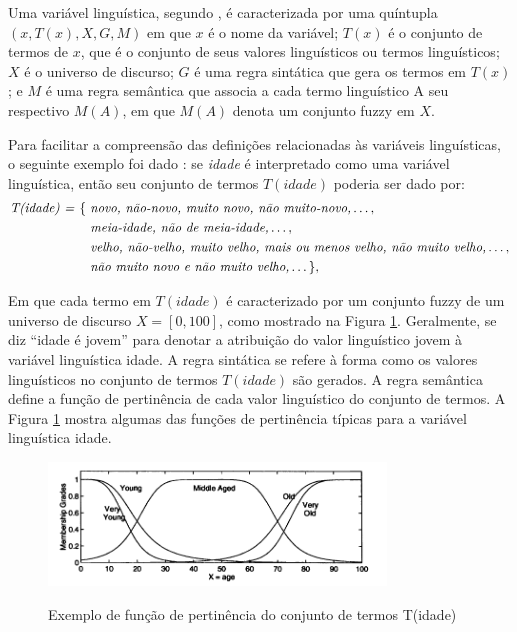Uma variável linguística, segundo , é caracterizada por uma quíntupla $(x,T(x),X,G,M)$ em que $x$ é o nome da variável; $T(x)$ é o conjunto de termos de $x$, que é o conjunto de seus valores linguísticos ou termos linguísticos; $X$ é o universo de discurso; $G$ é uma regra sintática que gera os termos em $T(x)$; e $M$ é uma regra semântica que associa a cada termo linguístico A seu respectivo $M(A)$, em que $M(A)$ denota um conjunto fuzzy em $X$.

Para facilitar a compreensão das definições relacionadas às variáveis linguísticas, o seguinte exemplo foi dado \cite[p.~55]{Jang1997}: se \textit{idade} é interpretado como uma variável linguística, então seu conjunto de termos $T(idade)$ poderia ser dado por:
\begin{align*}
\mbox{\textit{T(idade) = }}\{ &\mbox{ \textit{novo, não-novo, muito novo, não muito-novo,}} \dots, \\
&\mbox{ \textit{meia-idade, não de meia-idade,}} \dots, \\
&\mbox{ \textit{velho, não-velho, muito velho, mais ou menos velho, não muito velho,}} \dots, \\
&\mbox{ \textit{não muito novo e não muito velho,}} \dots \},
\end{align*}

Em que cada termo em $T(idade)$ é caracterizado por um conjunto fuzzy de um universo de discurso $X = [0,100]$, como mostrado na Figura \ref{fig:fuzzy_rules_jang}. Geralmente, se diz ``idade é jovem'' para denotar a atribuição do valor linguístico jovem à variável linguística idade. A regra sintática se refere à forma como os valores linguísticos no conjunto de termos $T(idade)$ são gerados. A regra semântica define a função de pertinência de cada valor linguístico do conjunto de termos. A Figura \ref{fig:fuzzy_rules_jang} mostra algumas das funções de pertinência típicas para a variável linguística idade.

\begin{figure}[!htb]
    \centering
    \caption{Exemplo de função de pertinência do conjunto de termos T(idade)}
    \includegraphics[width=0.8\textwidth]{./04-figuras/fund_teorica/fuzzy_rules_jang}
    \label{fig:fuzzy_rules_jang}
\end{figure}

